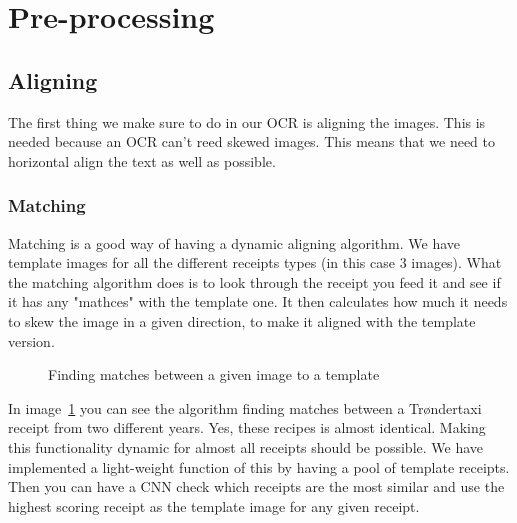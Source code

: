 \section{Pre-processing}\label{sec:pre-processing2}

\subsection{Aligning}\label{subsec:aligning}

The first thing we make sure to do in our OCR is aligning the images.
This is needed because an OCR can't reed skewed images.
This means that we need to horizontal align the text as well as possible.

\subsubsection[aligning]{Matching}

Matching is a good way of having a dynamic aligning algorithm.
We have template images for all the different receipts types (in this case 3 images).
What the matching algorithm does is to look through the receipt you feed it and see if it has any "mathces" with the template one.
It then calculates how much it needs to skew the image in a given direction, to make it aligned with the template version.

\begin{figure}[h]
    \caption{Finding matches between a given image to a template}
    \label{fig:OCR matching}
\end{figure}

In image~\ref{fig:OCR matching} you can see the algorithm finding matches between a Trøndertaxi receipt from two
different years.
Yes, these recipes is almost identical.
Making this functionality dynamic for almost all receipts should be possible.
We have implemented a light-weight function of this by having a pool of template receipts.
Then you can have a CNN check which receipts are the most similar and use the highest scoring receipt as the template image for any given receipt.

